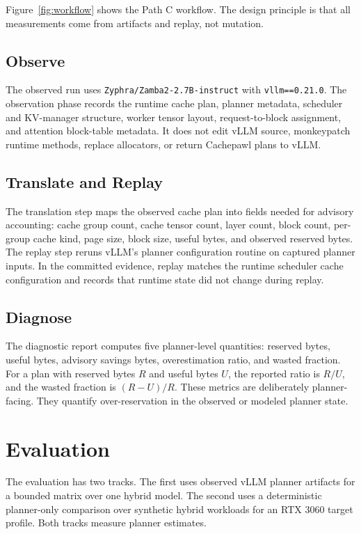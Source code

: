 \documentclass[10pt,twocolumn]{article}
\newcommand{\tool}{Cachepawl}
\newcommand{\pathc}{Path C}
\begin{document}
Figure~\ref{fig:workflow} shows the \pathc{} workflow. The design principle is
that all measurements come from artifacts and replay, not mutation.

\subsection{Observe}

The observed run uses \texttt{Zyphra/Zamba2-2.7B-instruct} with
\texttt{vllm==0.21.0}. The observation phase records the runtime cache plan,
planner metadata, scheduler and KV-manager structure, worker tensor layout,
request-to-block assignment, and attention block-table metadata. It does not
edit vLLM source, monkeypatch runtime methods, replace allocators, or return
\tool{} plans to vLLM.

\subsection{Translate and Replay}

The translation step maps the observed cache plan into fields needed for
advisory accounting: cache group count, cache tensor count, layer count, block
count, per-group cache kind, page size, block size, useful bytes, and observed
reserved bytes. The replay step reruns vLLM's planner configuration routine on
captured planner inputs. In the committed evidence, replay matches the runtime
scheduler cache configuration and records that runtime state did not change
during replay.

\subsection{Diagnose}

The diagnostic report computes five planner-level quantities:
reserved bytes, useful bytes, advisory savings bytes, overestimation ratio, and
wasted fraction. For a plan with reserved bytes $R$ and useful bytes $U$, the
reported ratio is $R/U$, and the wasted fraction is $(R-U)/R$. These metrics
are deliberately planner-facing. They quantify over-reservation in the
observed or modeled planner state.

\section{Evaluation}

The evaluation has two tracks. The first uses observed vLLM planner artifacts
for a bounded matrix over one hybrid model. The second uses a deterministic
planner-only comparison over synthetic hybrid workloads for an RTX 3060 target
profile. Both tracks measure planner estimates.
\end{document}

